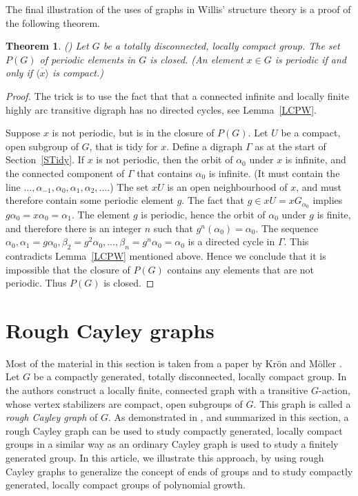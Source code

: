 \documentclass{emsprocart}
\newtheorem{theorem}{Theorem}[section]
\theoremstyle{definition}
\begin{document}
\bigskip

The final illustration of the uses of graphs in Willis' structure
theory is a proof of the
following theorem.

\begin{theorem} {\rm (\cite[Theorem 2]{Willis1995})}
Let $G$ be a totally disconnected, locally compact group.
The set $P(G)$ of periodic elements in $G$ is closed.
(An element $x\in G$ is {\em periodic} if and only if $\overline{\langle
  x\rangle}$ is compact.)
\end{theorem}

\begin{proof}  The trick is to use the fact that
that a connected infinite and locally finite highly arc
    transitive digraph has no directed cycles, see Lemma~\ref{LCPW}.

    Suppose $x$ is not periodic, but is in the closure of $P(G)$.
Let $U$ be a compact, open subgroup of $G$, that is tidy for
    $x$.  Define a digraph $\Gamma$ as at the start of
 Section~\ref{STidy}.  If $x$ is not periodic, then the orbit of
    $\alpha_0$ under $x$ is infinite, and the connected
    component of $\Gamma$ that contains $\alpha_0$ is infinite.  (It
    must contain the line $\ldots,\alpha_{-1}, \alpha_0, \alpha_1,
    \alpha_2,\ldots$.)
    The set $xU$ is an open neighbourhood of $x$, and must therefore
    contain some periodic element $g$.  The fact that $g\in xU=xG_{\alpha_0}$
implies
$g\alpha_0=x\alpha_0=\alpha_1$.  The element $g$ is periodic, hence
the orbit of $\alpha_0$ under $g$ is finite, and therefore there is an
integer $n$ such that $g^n(\alpha_0)=\alpha_0$.  The sequence
$\alpha_0, \alpha_1=g\alpha_0, \beta_2=g^2\alpha_0,
\ldots, \beta_n=g^n\alpha_0=\alpha_0$
is a directed cycle in
$\Gamma$.  This contradicts Lemma~\ref{LCPW}  mentioned above.
Hence we
conclude that it is impossible that the closure of $P(G)$ contains any
elements that are not periodic.  Thus $P(G)$ is closed.  \end{proof}

\section{Rough Cayley graphs}\label{SRough}

Most of the material in this section is taken from a paper by Kr\"on
 and M\"oller \cite{KronMoller2008}.   Let $G$ be a compactly
 generated, totally disconnected, locally compact group.  In
 \cite{KronMoller2008} the authors construct a locally finite,
 connected graph with a transitive $G$-action, whose vertex
 stabilizers are compact, open subgroups of $G$. This graph is called
 a {\em rough Cayley graph} of $G$. As demonstrated in
 \cite{KronMoller2008}, and summarized in this section, 
a rough Cayley graph can be used to study compactly generated, 
locally compact groups in a similar way as an ordinary Cayley 
graph is used to study a finitely generated group.
In this article, we illustrate this approach, by using rough 
Cayley graphs to generalize the concept of ends of groups and 
to study compactly generated, locally compact groups of 
polynomial growth. 
\end{document}

